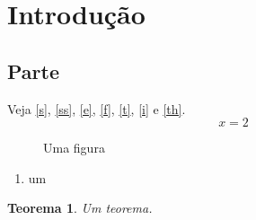 \documentclass{article}
\newtheorem{theorem}{Teorema}
\begin{document}
\section{Introdução}\label{s}
\subsection{Parte}\label{ss}
Veja \autoref{s}, \autoref{ss}, \autoref{e}, \autoref{f}, \autoref{t}, \autoref{i} e \autoref{th}.
\begin{equation}x = 2\label{e}\end{equation}
\begin{figure}[h]
\caption{Uma figura}\label{f}
\end{figure}
\begin{table}[h]
\caption{Uma tabela}\label{t}
\end{table}
\begin{enumerate}
\item um\label{i}
\end{enumerate}
\begin{theorem}\label{th}Um teorema.\end{theorem}
\end{document}
